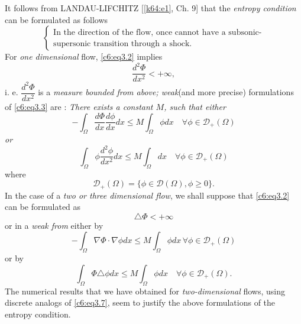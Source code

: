  It follows from  LANDAU-LIFCHITZ [\ref{k64:e1}, Ch. 9] that the
 \textit{entropy condition} can be formulated as follows   
 \begin{equation}
\begin{cases}
\text{In the direction of the flow,  once cannot have a subsonic-}\\
\text{supersonic transition through a shock.} \tag{3.2}\label{c6:eq3.2}
\end{cases} 
 \end{equation} 
 For \textit{one dimensional } flow,  \eqref{c6:eq3.2} implies 
 \begin{equation}
\frac{d^2 \Phi}{dx^2}< + \infty, \tag{3.3}\label{c6:eq3.3}
 \end{equation} 
 i. e.  $\dfrac{d^2 \Phi}{dx^2}$ is a \textit{measure bounded from 
 above; weak}(and more precise) formulations  of \eqref{c6:eq3.3} are : 
 \textit{There exists a constant $M$,  such that either}  
 \begin{equation}
-\int_\Omega \frac{d \Phi}{dx} \frac{d \phi}{dx} dx \leq M \int_\Omega 
\phi dx\quad  \forall \phi \in \mathscr{D}_+ (\Omega 
)\tag{3.4}\label{c6:eq3.4}   
 \end{equation} 
 \textit{or}
 \begin{equation}
\int_\Omega \phi \frac{d^2 \phi}{dx^2}dx \leq M \int_\Omega dx  \quad 
\forall \phi \in  \mathscr{D}_+ (\Omega )\tag{3.5}\label{c6:eq3.5} 
\end{equation} 
 where
\begin{equation}
\mathscr{D}_+ (\Omega ) = \{ \phi \in \mathscr{D} (\Omega ), \phi 
\geq 0 \}. \tag{3.6}\label{c6:eq3.6}  
\end{equation}\pageoriginale 
In the case of a \textit{two or three dimensional flow}, we shall 
suppose that \eqref{c6:eq3.2} can be formulated as  
\begin{equation}
\triangle \Phi < + \infty \tag{3.7}\label{c6:eq3.7}
\end{equation}
or in a \textit {weak from} either by
\begin{equation}
 -\int_\Omega \nabla \Phi \cdot \nabla \phi dx \leq M 
 \int_\Omega \phi dx \, \forall \phi \in \mathscr{D}_+ (\Omega 
 ) \tag{3.8}\label{c6:eq3.8}
\end{equation}
or by
\begin{equation}
\int_\Omega \Phi \triangle \phi dx \leq M \int_\Omega \phi dx \quad 
\forall \phi \in \mathscr{D}_+ (\Omega ). \tag{3.9}\label{c6:eq3.9}
\end{equation}
The numerical results that we have obtained for \textit 
{two-dimensional} flows, using discrete analogs  of \eqref{c6:eq3.7}, 
seem to justify the above formulations of the entropy condition.  

